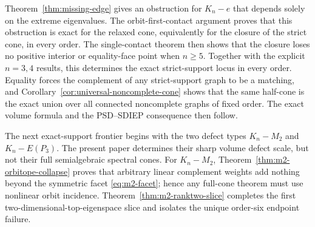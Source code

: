 \documentclass[11pt,reqno]{amsart}
\theoremstyle{definition}
\theoremstyle{remark}
\begin{document}
Theorem~\ref{thm:missing-edge} gives an obstruction for $K_n-e$ that depends
solely on the extreme eigenvalues.  The orbit-first-contact argument proves
that this obstruction is exact for the relaxed cone, equivalently for the
closure of the strict cone, in every order.  The single-contact theorem then
shows that the closure loses no positive interior or equality-face point when
$n\ge5$.  Together with the explicit $n=3,4$ results, this determines the
exact strict-support locus in every order.  Equality forces the complement
of any strict-support graph to be a matching, and
Corollary~\ref{cor:universal-noncomplete-cone} shows that the same half-cone
is the exact union over all connected noncomplete graphs of fixed order.
The exact volume formula and the PSD--SDIEP consequence then follow.

The next exact-support frontier begins with the two defect types
$K_n-M_2$ and $K_n-E(P_3)$.  The present paper determines their sharp volume
defect scale, but not their full semialgebraic spectral cones.  For
$K_n-M_2$, Theorem~\ref{thm:m2-orbitope-collapse} proves that arbitrary
linear complement weights add nothing beyond the symmetric facet
\eqref{eq:m2-facet}; hence any full-cone theorem must use nonlinear orbit
incidence.  Theorem~\ref{thm:m2-ranktwo-slice} completes the first
two-dimensional-top-eigenspace slice and isolates the unique order-six
endpoint failure.
\end{document}
